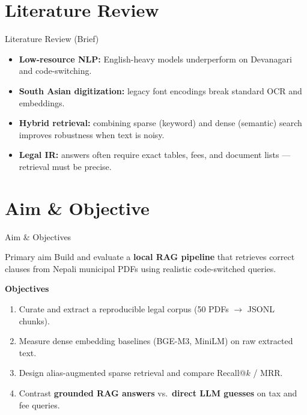 \documentclass[11pt,aspectratio=169]{beamer}
\begin{document}
\section{Literature Review}
\begin{frame}{Literature Review (Brief)}
  \begin{itemize}
    \item \textbf{Low-resource NLP:} English-heavy models underperform on Devanagari and code-switching.
    \item \textbf{South Asian digitization:} legacy font encodings break standard OCR and embeddings.
    \item \textbf{Hybrid retrieval:} combining sparse (keyword) and dense (semantic) search improves robustness when text is noisy.
    \item \textbf{Legal IR:} answers often require exact tables, fees, and document lists — retrieval must be precise.
  \end{itemize}
\end{frame}

\section{Aim \& Objective}
\begin{frame}{Aim \& Objectives}
  \begin{block}{Primary aim}
    Build and evaluate a \textbf{local RAG pipeline} that retrieves correct clauses from Nepali municipal PDFs using realistic code-switched queries.
  \end{block}
  \textbf{Objectives}
  \begin{enumerate}
    \item Curate and extract a reproducible legal corpus (50 PDFs $\rightarrow$ JSONL chunks).
    \item Measure dense embedding baselines (BGE-M3, MiniLM) on raw extracted text.
    \item Design alias-augmented sparse retrieval and compare Recall@$k$ / MRR.
    \item Contrast \textbf{grounded RAG answers} vs.\ \textbf{direct LLM guesses} on tax and fee queries.
  \end{enumerate}
\end{frame}

\end{document}
